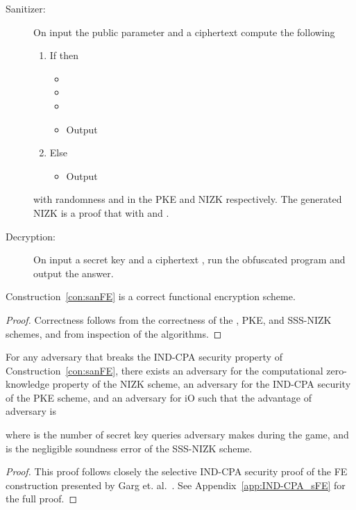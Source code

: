 \documentclass{llncs}
\begin{document}
\begin{description}
\item[Sanitizer:] On input the public parameter  and a ciphertext  compute the following
	\begin{enumerate}
	\item If  then
		\begin{itemize}
		\item[] 
		\item[] 
		\item[] 
		\item[] Output 
		\end{itemize}
	\item Else
		\begin{itemize}
		\item[] Output 
		\end{itemize}
	\end{enumerate}
	with randomness  and  in the PKE and NIZK respectively. The  generated NIZK is a proof that  with   and .
	
	
\item[Decryption:] On input a secret key  and a ciphertext , run the obfuscated program  and output the answer.


\end{description}


\begin{lem}
Construction~\ref{con:sanFE} is a correct functional encryption scheme.
\end{lem}

\begin{proof}
Correctness follows from the correctness of the , PKE, and SSS-NIZK schemes, and from inspection of the algorithms.
\end{proof}



\begin{lem}\label{lem:IND-CPA_sFE}
For any adversary  that breaks the IND-CPA security property of Construction~\ref{con:sanFE}, there exists an adversary  for the computational zero-knowledge property of the NIZK scheme, an adversary  for the IND-CPA security of the PKE scheme, and an adversary  for iO such that the advantage of adversary  is

where  is the number of secret key queries adversary  makes during the game, and  is the negligible soundness error of the SSS-NIZK scheme.
\end{lem}


\begin{proof}
This proof follows closely the selective IND-CPA security proof of the FE construction presented by Garg et. al.~\cite{DBLP:conf/focs/GargGH0SW13}.
See Appendix~\ref{app:IND-CPA_sFE} for the full proof.
\end{proof}
\end{document}
